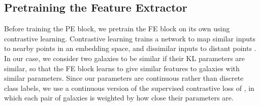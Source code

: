 
\subsection{Pretraining the Feature Extractor}
\label{ssec:pretrain}
Before training the PE block, we pretrain the FE block on its own using contrastive learning. Contrastive learning trains a network to map similar inputs to nearby points in an embedding space, and dissimilar inputs to distant points \citep{SimCLR, SupCon}. In our case, we consider two galaxies to be similar if their KL parameters are similar, so that the FE block learns to give similar features to galaxies with similar parameters. Since our parameters are continuous rather than discrete class labels, we use a continuous version of the supervised contrastive loss of \citep{SupCon}, in which each pair of galaxies is weighted by how close their parameters are. 

